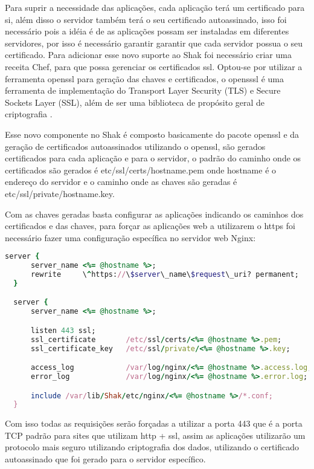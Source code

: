 Para suprir a necessidade das aplicações, cada aplicação terá um certificado para
si, além disso o servidor também terá o seu certificado autoassinado, isso foi necessário
pois a idéia é de as aplicações possam ser instaladas em diferentes servidores, por
isso é necessário garantir garantir que cada servidor possua o seu certificado. Para adicionar
esse novo suporte ao Shak foi necessário criar uma receita Chef,
para que possa gerenciar os certificados ssl. Optou-se por utilizar a ferramenta
openssl para geração das chaves e certificados, o opensssl é uma ferramenta de
implementação do Transport Layer Security (TLS) e Secure Sockets Layer (SSL),
além de ser uma biblioteca de propósito geral de criptografia \cite{openssl}.

Esse novo componente no Shak é composto basicamente do pacote openssl e da geração
de certificados autoassinados utilizando o openssl, são gerados certificados
para cada aplicação e para o servidor, o padrão do caminho onde os certificados são
gerados é etc/ssl/certs/hostname.pem onde hostname é o endereço do servidor
e o caminho onde as chaves são geradas é etc/ssl/private/hostname.key.

Com as chaves geradas basta configurar as aplicações indicando os caminhos dos certificados
e das chaves, para forçar as aplicações web a utilizarem o https foi necessário fazer
uma configuração específica no servidor web Nginx:


\begin{lstlisting}[language=Ruby,label=dice_index,caption={Exemplo de arquivo de configuração do Nginx para aplicações web no shak}]
  server {
      server_name <%= @hostname %>;
      rewrite     \^https://\$server\_name\$request\_uri? permanent;
  }

  server {
      server_name <%= @hostname %>;

      listen 443 ssl;
      ssl_certificate       /etc/ssl/certs/<%= @hostname %>.pem;
      ssl_certificate_key   /etc/ssl/private/<%= @hostname %>.key;

      access_log            /var/log/nginx/<%= @hostname %>.access.log;
      error_log             /var/log/nginx/<%= @hostname %>.error.log;

      include /var/lib/Shak/etc/nginx/<%= @hostname %>/*.conf;
  }
\end{lstlisting}

Com isso todas as requisições serão forçadas a utilizar a porta 443 que é a porta
TCP padrão para sites que utilizam http + ssl, assim as aplicações utilizarão
um protocolo mais seguro utilizando criptografia dos dados, utilizando o
certificado autoassinado que foi gerado para o servidor específico.


